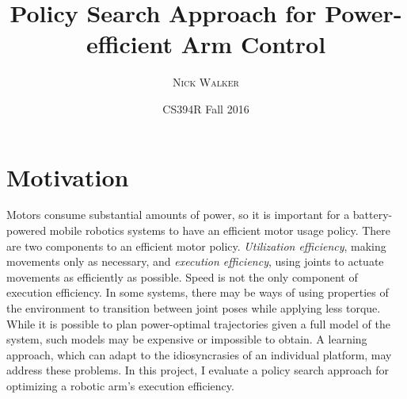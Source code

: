 \documentclass{article}
\title{Policy Search Approach for Power-efficient Arm Control}
\author{\textsc{Nick Walker}}
\date{CS394R Fall 2016} %
\begin{document}
	
\maketitle %


\def\expx(#1){e^(#1)}

\def\FunctionF(#1,#2,#3,#4){((#2)*(#1)^3 + (#3)*(#1)^2 + (#4)*(#1)) / ((#2) + (#3) + (#4) )}
\def \GraphJoint(#1,#2,#3){
	\nextgroupplot[%
		axis y line=center,
		axis x line=middle, 
		axis on top=false,
		xmin=0,
		xmax=1,
		ymin=-0.4,
		ymax=1,
		height=3.75cm,
		width=3.0cm,
		grid,
		xtick={0,0.2,...,1},
		ytick={-0.4,-0.2,...,1},
		yticklabel=\empty,
		xticklabel=\empty,
		axis line style = thick
		]
		\addplot [domain=0:1, samples=50, mark=none, ultra thick, blue] {\FunctionF(x,#1,#2,#3)};

	}



\section{Motivation}

Motors consume substantial amounts of power, so it is important for a battery-powered mobile robotics systems to have an efficient motor usage policy. There are two components to an efficient motor policy. \textit{Utilization efficiency}, making movements only as necessary, and \textit{execution efficiency}, using joints to actuate movements as efficiently as possible. Speed is not the only component of execution efficiency. In some systems, there may be ways of using properties of the environment to transition between joint poses while  applying less torque. While it is possible to plan power-optimal trajectories given a full model of the system, such models may be expensive or impossible to obtain. A learning approach, which can adapt to the idiosyncrasies of an individual platform, may address these problems. In this project, I evaluate a policy search approach for optimizing a robotic arm's execution efficiency.


\end{document}

